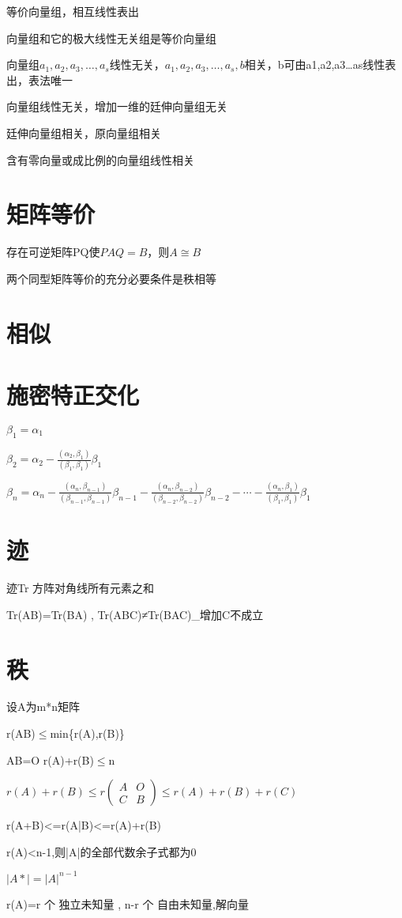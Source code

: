 \documentclass[UTF8]{ctexart}
\begin{document}
等价向量组，相互线性表出

向量组和它的极大线性无关组是等价向量组 

向量组$a_{1},a_{2},a_{3},\ldots,a_{s}$线性无关，$a_{1},a_{2},a_{3},\ldots,a_{s},b$相关，b可由a1,a2,a3…as线性表出，表法唯一 

向量组线性无关，增加一维的廷伸向量组无关 

廷伸向量组相关，原向量组相关

含有零向量或成比例的向量组线性相关 

\section{矩阵等价}

存在可逆矩阵PQ使$PAQ=B$，则$A\cong B$

两个同型矩阵等价的充分必要条件是秩相等

\section{相似}

\section{施密特正交化}

$\beta_{1}=\alpha_{1}$

$\beta_{2}=\alpha_{2}-\frac{(\alpha_{2},\beta_{1})}{(\beta_{1},\beta_{1})}\beta_{1}$

$\beta_{n}=\alpha_{n}-\frac{(\alpha_{n},\beta_{n-1})}{(\beta_{n-1},\beta_{n-1})}\beta_{n-1}-\frac{(\alpha_{n},\beta_{n-2})}{(\beta_{n-2},\beta_{n-2})}\beta_{n-2}-\cdots-\frac{(\alpha_{n},\beta_{1})}{(\beta_{1},\beta_{1})}\beta_{1}$

\section{迹}

迹Tr 方阵对角线所有元素之和

Tr(AB)=Tr(BA) , Tr(ABC)≠Tr(BAC)\_增加C不成立

\section{秩}

设A为m{*}n矩阵

r(AB)$\leq$min\{r(A),r(B)\}

AB=O r(A)+r(B)$\leq$n

$r(A)+r(B)\leq r\begin{pmatrix}A & O\\
C & B
\end{pmatrix}\leq r(A)+r(B)+r(C)$

r(A+B)<=r(A|B)<=r(A)+r(B)

r(A)<n-1,则|A|的全部代数余子式都为0

$|A*|=|A|^{n-1}$

r(A)=r 个 独立未知量 , n-r 个 自由未知量,解向量 
\end{document}
